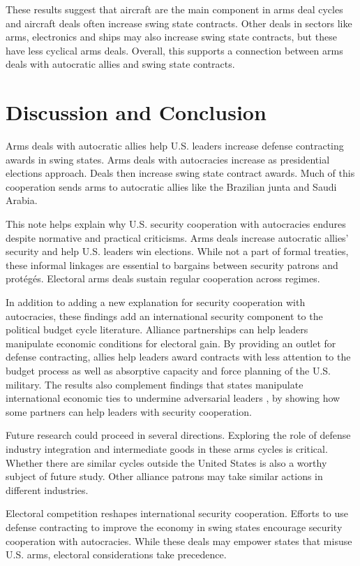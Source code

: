 \documentclass[12pt]{article}
\begin{document}
These results suggest that aircraft are the main component in arms deal cycles and aircraft deals often increase swing state contracts. 
Other deals in sectors like arms, electronics and ships may also increase swing state contracts, but these have less cyclical arms deals. 
Overall, this supports a connection between arms deals with autocratic allies and swing state contracts.  



\section{Discussion and Conclusion}


Arms deals with autocratic allies help U.S. leaders increase defense contracting awards in swing states. 
Arms deals with autocracies increase as presidential elections approach.
Deals then increase swing state contract awards. 
Much of this cooperation sends arms to autocratic allies like the Brazilian junta and Saudi Arabia.


This note helps explain why U.S. security cooperation with autocracies endures despite normative and practical criticisms. 
Arms deals increase autocratic allies' security and help U.S. leaders win elections.
While not a part of formal treaties, these informal linkages are essential to bargains between security patrons and prot{\'e}g{\'e}s.
Electoral arms deals sustain regular cooperation across regimes.


In addition to adding a new explanation for security cooperation with autocracies, these findings add an international security component to the political budget cycle literature.
Alliance partnerships can help leaders manipulate economic conditions for electoral gain. 
By providing an outlet for defense contracting, allies help leaders award contracts with less attention to the budget process as well as absorptive capacity and force planning of the U.S. military.
The results also complement findings that states manipulate international economic ties to undermine adversarial leaders \citep{ChyzhUrbatsch2021, KimMargalit2021}, by showing how some partners can help leaders with security cooperation. 



Future research could proceed in several directions. 
Exploring the role of defense industry integration and intermediate goods in these arms cycles is critical.
Whether there are similar cycles outside the United States is also a worthy subject of future study. 
Other alliance patrons may take similar actions in different industries.


Electoral competition reshapes international security cooperation.
Efforts to use defense contracting to improve the economy in swing states encourage security cooperation with autocracies.
While these deals may empower states that misuse U.S. arms, electoral considerations take precedence. 


\newpage
\singlespace
 
 
\end{document}
